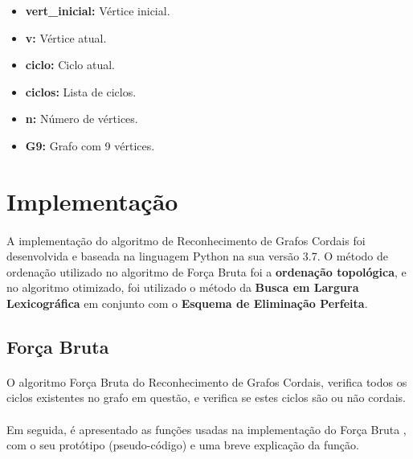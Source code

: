 \documentclass[a4paper, 11pt]{article}
\begin{document}
\begin{itemize}
			\item \textbf{vert\_inicial:} Vértice inicial.
			\item \textbf{v:} Vértice atual.
			\item \textbf{ciclo:} Ciclo atual.
			\item \textbf{ciclos:} Lista de ciclos.
			\item \textbf{n:} Número de vértices.
			\item \textbf{G9:} Grafo com 9 vértices.
			
			
		\end{itemize}
		\section{Implementação}
			\paragraph{} A implementação do algoritmo de Reconhecimento de Grafos Cordais foi desenvolvida e baseada na linguagem Python na sua versão 3.7. O método de ordenação utilizado no algoritmo de Força Bruta foi a \textbf{ordenação topológica}, e no algoritmo otimizado, foi utilizado o método da \textbf{Busca em Largura Lexicográfica} em conjunto com o \textbf{Esquema de Eliminação Perfeita}.
				
			\subsection{Força Bruta}
				\paragraph{} O algoritmo Força Bruta do Reconhecimento de Grafos Cordais, verifica todos os ciclos existentes no grafo em questão, e verifica se estes ciclos são ou não cordais.

				\paragraph{} Em seguida, é apresentado as funções usadas na implementação do Força Bruta , com o seu protótipo (pseudo-código) e uma breve explicação da função.
					
\end{document}
